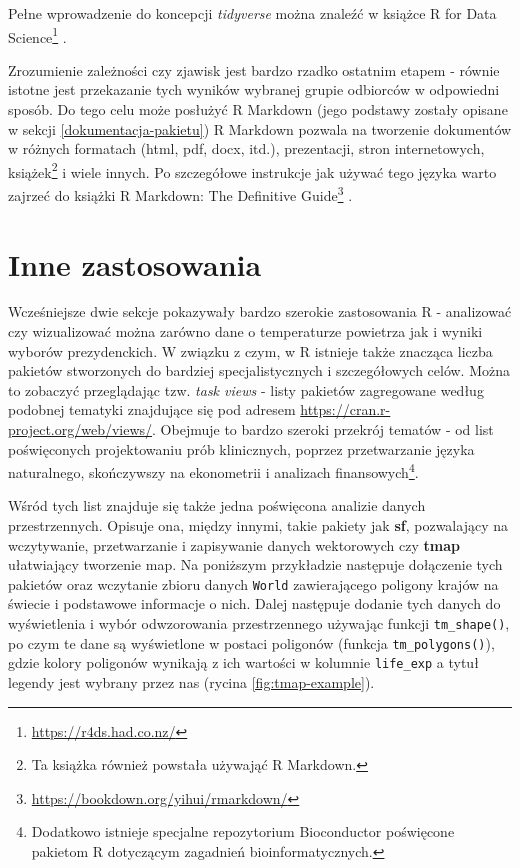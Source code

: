 \documentclass[paper=6in:9in,pagesize=pdftex,headinclude=on,footinclude=on,10pt]{scrbook}
\DeclareRobustCommand{\href}[2]{#2\footnote{\url{#1}}}
\begin{document}
Pełne wprowadzenie do koncepcji \emph{tidyverse} można znaleźć w książce \href{https://r4ds.had.co.nz/}{R for Data Science} \citep{wickham2016r}.

Zrozumienie zależności czy zjawisk jest bardzo rzadko ostatnim etapem - równie istotne jest przekazanie tych wyników wybranej grupie odbiorców w odpowiedni sposób.
Do tego celu może posłużyć R Markdown (jego podstawy zostały opisane w sekcji \ref{dokumentacja-pakietu})
R Markdown pozwala na tworzenie dokumentów w różnych formatach (html, pdf, docx, itd.), prezentacji, stron internetowych, książek\footnote{Ta książka również powstała używająć R Markdown.} i wiele innych.
Po szczegółowe instrukcje jak używać tego języka warto zajrzeć do książki
\href{https://bookdown.org/yihui/rmarkdown/}{R Markdown: The Definitive Guide} \citep{xieMarkdownDefinitiveGuide2018}.

\hypertarget{inne-zastosowania}{%
\section{Inne zastosowania}\label{inne-zastosowania}}

Wcześniejsze dwie sekcje pokazywały bardzo szerokie zastosowania R - analizować czy wizualizować można zarówno dane o temperaturze powietrza jak i wyniki wyborów prezydenckich.
W związku z czym, w R istnieje także znacząca liczba pakietów stworzonych do bardziej specjalistycznych i szczegółowych celów.
Można to zobaczyć przeglądając tzw. \emph{task views} - listy pakietów zagregowane według podobnej tematyki znajdujące się pod adresem \url{https://cran.r-project.org/web/views/}.
Obejmuje to bardzo szeroki przekrój tematów - od list poświęconych projektowaniu prób klinicznych, poprzez przetwarzanie języka naturalnego, skończywszy na ekonometrii i analizach finansowych\footnote{Dodatkowo istnieje specjalne repozytorium Bioconductor poświęcone pakietom R dotyczącym zagadnień bioinformatycznych.}.

Wśród tych list znajduje się także jedna poświęcona analizie danych przestrzennych.
Opisuje ona, między innymi, takie pakiety jak \textbf{sf}, pozwalający na wczytywanie, przetwarzanie i zapisywanie danych wektorowych czy \textbf{tmap} ułatwiający tworzenie map.
Na poniższym przykładzie następuje dołączenie tych pakietów oraz wczytanie zbioru danych \texttt{World} zawierającego poligony krajów na świecie i podstawowe informacje o nich.
Dalej następuje dodanie tych danych do wyświetlenia i wybór odwzorowania przestrzennego używając funkcji \texttt{tm\_shape()}, po czym te dane są wyświetlone w postaci poligonów (funkcja \texttt{tm\_polygons()}), gdzie kolory poligonów wynikają z ich wartości w kolumnie \texttt{life\_exp} a tytuł legendy jest wybrany przez nas (rycina \ref{fig:tmap-example}).
\end{document}
